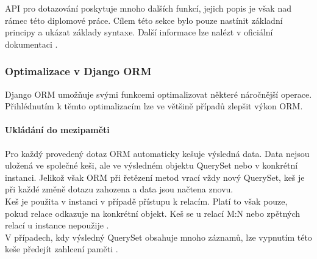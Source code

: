 \documentclass[ing,male,java,dept456]{diploma}						%
\begin{document}
API pro dotazování poskytuje mnoho dalších funkcí, jejich popis je však nad rámec této diplomové práce. Cílem této sekce bylo pouze nastínit základní principy a ukázat základy syntaxe. Další informace lze nalézt v oficiální dokumentaci \cite{djangodoc}.

\subsubsection{Optimalizace v Django ORM}

Django ORM umožňuje svými funkcemi optimalizovat některé náročnější operace. Přihlédnutím k těmto optimalizacím lze ve většině případů zlepšit výkon ORM. 

\paragraph{Ukládání do mezipaměti}

Pro každý provedený dotaz ORM automaticky kešuje výsledná data. Data nejsou uložená ve společné keši, ale ve výsledném objektu QuerySet nebo v konkrétní instanci. Jelikož však ORM při řetězení metod vrací vždy nový QuerySet, keš je při každé změně dotazu zahozena a data jsou načtena znovu. \\
Keš je použita v instanci v případě přístupu k relacím. Platí to však pouze, pokud relace odkazuje na konkrétní objekt. Keš se u relací M:N nebo zpětných relací u instance nepoužije \cite{dj-qscache}. \\
V případech, kdy výsledný QuerySet obsahuje mnoho záznamů, lze vypnutím této keše předejít zahlcení paměti \cite{dj-iterator}.
\end{document}
